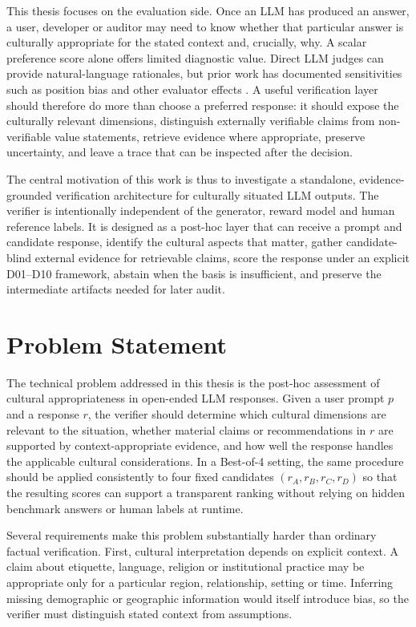 This thesis focuses on the evaluation side. Once an LLM has produced an answer, a user, developer or auditor may need to know whether that particular answer is culturally appropriate for the stated context and, crucially, why. A scalar preference score alone offers limited diagnostic value. Direct LLM judges can provide natural-language rationales, but prior work has documented sensitivities such as position bias and other evaluator effects \parencite{zheng2023llmjudge,wang2024notfairevaluators}. A useful verification layer should therefore do more than choose a preferred response: it should expose the culturally relevant dimensions, distinguish externally verifiable claims from non-verifiable value statements, retrieve evidence where appropriate, preserve uncertainty, and leave a trace that can be inspected after the decision.

The central motivation of this work is thus to investigate a standalone, evidence-grounded verification architecture for culturally situated LLM outputs. The verifier is intentionally independent of the generator, reward model and human reference labels. It is designed as a post-hoc layer that can receive a prompt and candidate response, identify the cultural aspects that matter, gather candidate-blind external evidence for retrievable claims, score the response under an explicit D01--D10 framework, abstain when the basis is insufficient, and preserve the intermediate artifacts needed for later audit.

\section{Problem Statement}

The technical problem addressed in this thesis is the post-hoc assessment of cultural appropriateness in open-ended LLM responses. Given a user prompt $p$ and a response $r$, the verifier should determine which cultural dimensions are relevant to the situation, whether material claims or recommendations in $r$ are supported by context-appropriate evidence, and how well the response handles the applicable cultural considerations. In a Best-of-4 setting, the same procedure should be applied consistently to four fixed candidates $(r_A,r_B,r_C,r_D)$ so that the resulting scores can support a transparent ranking without relying on hidden benchmark answers or human labels at runtime.

Several requirements make this problem substantially harder than ordinary factual verification. First, cultural interpretation depends on explicit context. A claim about etiquette, language, religion or institutional practice may be appropriate only for a particular region, relationship, setting or time. Inferring missing demographic or geographic information would itself introduce bias, so the verifier must distinguish stated context from assumptions.

